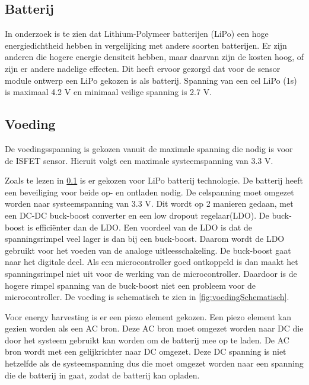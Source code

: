 \subsection{Batterij} \label{sec:battery}
In onderzoek \cite{BatteryComparison} is te zien dat Lithium-Polymeer batterijen (LiPo) een hoge energiedichtheid hebben in vergelijking met andere soorten batterijen. Er zijn anderen die hogere energie densiteit hebben, maar daarvan zijn de kosten hoog, of zijn er andere nadelige effecten\cite{BatteryComparison}. Dit heeft ervoor gezorgd dat voor de sensor module ontwerp een LiPo gekozen is als batterij. Spanning van een cel LiPo (1s) is maximaal 4.2 V en minimaal veilige spanning is 2.7 V\cite{BatteryComparison}.

\subsection{Voeding} \label{sec:voeding} 


De voedingsspanning is gekozen vanuit de maximale spanning die nodig is voor de ISFET sensor\cite{isfet}. Hieruit volgt een maximale systeemspanning van 3.3 V. 


Zoals te lezen in \cref{sec:battery} is er gekozen voor LiPo batterij technologie. De batterij heeft een beveiliging voor beide op- en ontladen nodig. De celspanning moet omgezet worden naar systeemspanning van 3.3 V. Dit wordt op 2 manieren gedaan, met een DC-DC buck-boost converter en een low dropout regelaar(LDO). De buck-boost is efficiënter dan de LDO. Een voordeel van de LDO is dat de spanningsrimpel veel lager is dan bij een buck-boost. Daarom wordt de LDO gebruikt voor het voeden van de analoge uitleesschakeling. De buck-boost gaat naar het digitale deel. Als een microcontroller goed ontkoppeld is dan maakt het spanningsrimpel niet uit voor de werking van de microcontroller. Daardoor is de hogere rimpel spanning van de buck-boost niet een probleem voor de microcontroller. De voeding is schematisch te zien in \cref{fig:voedingSchematisch}.

Voor energy harvesting is er een piezo element gekozen. Een piezo element kan gezien worden als een AC bron. Deze AC bron moet omgezet worden naar DC die door het systeem gebruikt kan worden om de batterij mee op te laden. De AC bron wordt met een gelijkrichter naar DC omgezet. Deze DC spanning is niet hetzelfde als de systeemspanning dus die moet omgezet worden naar een spanning die de batterij in gaat, zodat de batterij kan opladen.

